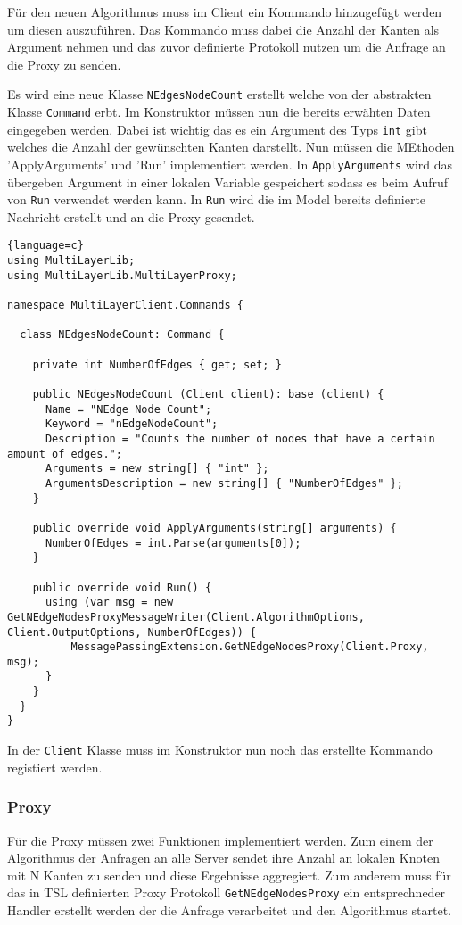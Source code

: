 Für den neuen Algorithmus muss im Client ein Kommando hinzugefügt werden um diesen auszuführen. Das Kommando muss dabei die Anzahl der Kanten als Argument nehmen und das zuvor definierte Protokoll nutzen um die Anfrage an die Proxy zu senden.

Es wird eine neue Klasse \verb|NEdgesNodeCount| erstellt welche von der abstrakten Klasse \verb|Command| erbt. Im Konstruktor müssen nun die bereits erwähten Daten eingegeben werden. Dabei ist wichtig das es ein Argument des Typs \verb|int| gibt welches die Anzahl der gewünschten Kanten darstellt.
Nun müssen die MEthoden 'ApplyArguments' und 'Run' implementiert werden.
In \verb|ApplyArguments| wird das übergeben Argument in einer lokalen Variable gespeichert sodass es beim Aufruf von \verb|Run| verwendet werden kann.
In \verb|Run| wird die im Model bereits definierte Nachricht erstellt und an die Proxy gesendet.

\begin{lstlisting}{language=c}
using MultiLayerLib;
using MultiLayerLib.MultiLayerProxy;

namespace MultiLayerClient.Commands {

  class NEdgesNodeCount: Command {

    private int NumberOfEdges { get; set; }

    public NEdgesNodeCount (Client client): base (client) {
      Name = "NEdge Node Count";
      Keyword = "nEdgeNodeCount";
      Description = "Counts the number of nodes that have a certain amount of edges.";
      Arguments = new string[] { "int" };
      ArgumentsDescription = new string[] { "NumberOfEdges" };
    }

    public override void ApplyArguments(string[] arguments) {
      NumberOfEdges = int.Parse(arguments[0]);
    }

    public override void Run() {
      using (var msg = new GetNEdgeNodesProxyMessageWriter(Client.AlgorithmOptions, Client.OutputOptions, NumberOfEdges)) {
          MessagePassingExtension.GetNEdgeNodesProxy(Client.Proxy, msg);
      }      
    }
  }
}
\end{lstlisting}


In der \verb|Client| Klasse muss im Konstruktor nun noch das erstellte Kommando registiert werden.

\subsubsection{Proxy}

Für die Proxy müssen zwei Funktionen implementiert werden. Zum einem der Algorithmus der Anfragen an alle Server sendet ihre Anzahl an lokalen Knoten mit N Kanten zu senden und diese Ergebnisse aggregiert. Zum anderem muss 
für das in TSL definierten Proxy Protokoll \verb|GetNEdgeNodesProxy| ein entsprechneder Handler erstellt werden der die Anfrage verarbeitet und den Algorithmus startet.

